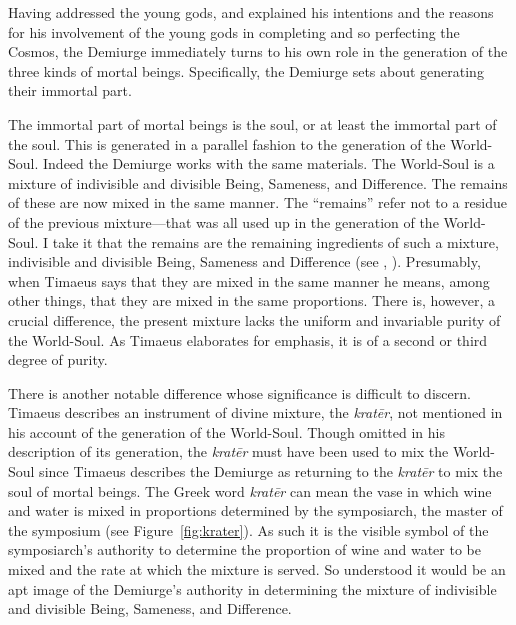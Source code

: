 Having addressed the young gods, and explained his intentions and the reasons for his involvement of the young gods in completing and so perfecting the Cosmos, the Demiurge immediately turns to his own role in the generation of the three kinds of mortal beings. Specifically, the Demiurge sets about generating their immortal part. 

The immortal part of mortal beings is the soul, or at least the immortal part of the soul. This is generated in a parallel fashion to the generation of the World-Soul. Indeed the Demiurge works with the same materials. The World-Soul is a mixture of indivisible and divisible Being, Sameness, and Difference. The remains of these are now mixed in the same manner. The ``remains'' refer not to a residue of the previous mixture---that was all used up in the generation of the World-Soul. I take it that the remains are the remaining ingredients of such a mixture, indivisible and divisible Being, Sameness and Difference (see \citealt[141 n10]{Archer-Hind:1888qd}, \citealt[255]{Taylor:1928qb}). Presumably, when Timaeus says that they are mixed in the same manner he means, among other things, that they are mixed in the same proportions. There is, however, a crucial difference, the present mixture lacks the uniform and invariable purity of the World-Soul. As Timaeus elaborates for emphasis, it is of a second or third degree of purity. 

There is another notable difference whose significance is difficult to discern. Timae\-us describes an instrument of divine mixture, the \emph{kratēr}, not mentioned in his account of the generation of the World-Soul. Though omitted in his description of its generation, the \emph{kratēr} must have been used to mix the World-Soul since Timaeus describes the Demiurge as returning to the \emph{kratēr} to mix the soul of mortal beings. The Greek word \emph{kratēr} can mean the vase in which wine and water is mixed in proportions determined by the symposiarch, the master of the symposium (see Figure~\ref{fig:krater}). As such it is the visible symbol of the symposiarch's authority to determine the proportion of wine and water to be mixed and the rate at which the mixture is served. So understood it would be an apt image of the Demiurge's authority in determining the mixture of indivisible and divisible Being, Sameness, and Difference. 

